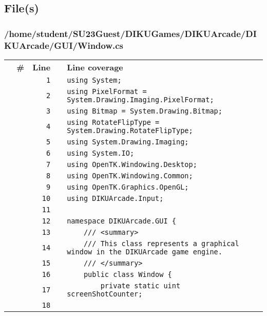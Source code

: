 \documentclass[a4paper,landscape,10pt]{article}
\begin{document}
\subsection{File(s)}
\subsubsection{/home/student/SU23Guest/DIKUGames/DIKUArcade/DIKUArcade/GUI/Window.cs}
\begin{longtable}[l]{lrrll}
\textbf{} & \textbf{\#} & \textbf{Line} & \textbf{} & \textbf{Line coverage}\\
\cellcolor{gray} &  & \verb~1~ & & \verb~using System;~\\
\cellcolor{gray} &  & \verb~2~ & & \verb~using PixelFormat = System.Drawing.Imaging.PixelFormat;~\\
\cellcolor{gray} &  & \verb~3~ & & \verb~using Bitmap = System.Drawing.Bitmap;~\\
\cellcolor{gray} &  & \verb~4~ & & \verb~using RotateFlipType = System.Drawing.RotateFlipType;~\\
\cellcolor{gray} &  & \verb~5~ & & \verb~using System.Drawing.Imaging;~\\
\cellcolor{gray} &  & \verb~6~ & & \verb~using System.IO;~\\
\cellcolor{gray} &  & \verb~7~ & & \verb~using OpenTK.Windowing.Desktop;~\\
\cellcolor{gray} &  & \verb~8~ & & \verb~using OpenTK.Windowing.Common;~\\
\cellcolor{gray} &  & \verb~9~ & & \verb~using OpenTK.Graphics.OpenGL;~\\
\cellcolor{gray} &  & \verb~10~ & & \verb~using DIKUArcade.Input;~\\
\cellcolor{gray} &  & \verb~11~ & & \verb~~\\
\cellcolor{gray} &  & \verb~12~ & & \verb~namespace DIKUArcade.GUI {~\\
\cellcolor{gray} &  & \verb~13~ & & \verb~    /// <summary>~\\
\cellcolor{gray} &  & \verb~14~ & & \verb~    /// This class represents a graphical window in the DIKUArcade game engine.~\\
\cellcolor{gray} &  & \verb~15~ & & \verb~    /// </summary>~\\
\cellcolor{gray} &  & \verb~16~ & & \verb~    public class Window {~\\
\cellcolor{gray} &  & \verb~17~ & & \verb~        private static uint screenShotCounter;~\\
\cellcolor{gray} &  & \verb~18~ & & \verb~~\\

\end{longtable}
\end{document}
